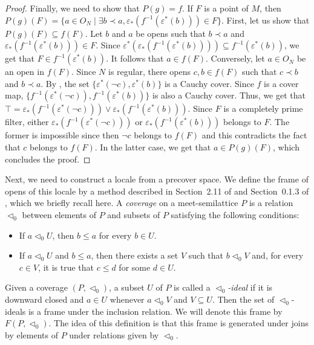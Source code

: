\documentclass[reqno]{amsart}
\theoremstyle{definition}
\theoremstyle{remark}
\numberwithin{figure}{section}
\newcommand{\rb}{\prec}
\begin{document}
\begin{proof}
Finally, we need to show that $P(g) = f$.
If $F$ is a point of $M$, then $P(g)(F) = \{ a \in O_N \mid \exists b \rb a, \varepsilon_*(f^{-1}(\varepsilon^*(b))) \in F \}$.
First, let us show that $P(g)(F) \subseteq f(F)$.
Let $b$ and $a$ be opens such that $b \rb a$ and $\varepsilon_*(f^{-1}(\varepsilon^*(b))) \in F$.
Since $\varepsilon^*(\varepsilon_*(f^{-1}(\varepsilon^*(b)))) \subseteq f^{-1}(\varepsilon^*(b))$, we get that $F \in f^{-1}(\varepsilon^*(b))$.
It follows that $a \in f(F)$.
Conversely, let $a \in O_N$ be an open in $f(F)$.
Since $N$ is regular, there opens $c,b \in f(F)$ such that $c \rb b$ and $b \rb a$.
By , the set $\{ \varepsilon^*(\neg c), \varepsilon^*(b) \}$ is a Cauchy cover.
Since $f$ is a cover map, $\{ f^{-1}(\varepsilon^*(\neg c)), f^{-1}(\varepsilon^*(b)) \}$ is also a Cauchy cover.
Thus, we get that $\top = \varepsilon_*(f^{-1}(\varepsilon^*(\neg c))) \vee \varepsilon_*(f^{-1}(\varepsilon^*(b)))$.
Since $F$ is a completely prime filter, either $\varepsilon_*(f^{-1}(\varepsilon^*(\neg c)))$ or $\varepsilon_*(f^{-1}(\varepsilon^*(b)))$ belongs to $F$.
The former is impossible since then $\neg c$ belongs to $f(F)$ and this contradicts the fact that $c$ belongs to $f(F)$.
In the latter case, we get that $a \in P(g)(F)$, which concludes the proof.
\end{proof}

Next, we need to construct a locale from a precover space.
We define the frame of opens of this locale by a method described in Section~2.11 of \cite{stone-spaces} and Section~0.1.3 of \cite{vickers-compact}, which we briefly recall here.
A \emph{coverage} on a meet-semilattice $P$ is a relation $\triangleleft_0$ between elements of $P$ and subsets of $P$ satisfying the following conditions:
\begin{itemize}
\item If $a \triangleleft_0 U$, then $b \leq a$ for every $b \in U$.
\item If $a \triangleleft_0 U$ and $b \leq a$, then there exists a set $V$ such that $b \triangleleft_0 V$ and, for every $c \in V$, it is true that $c \leq d$ for some $d \in U$.
\end{itemize}
Given a coverage $(P,\triangleleft_0)$, a subset $U$ of $P$ is called a \emph{$\triangleleft_0$-ideal} if it is downward closed and $a \in U$ whenever $a \triangleleft_0 V$ and $V \subseteq U$.
Then the set of $\triangleleft_0$-ideals is a frame under the inclusion relation.
We will denote this frame by $F(P,\triangleleft_0)$.
The idea of this definition is that this frame is generated under joins by elements of $P$ under relations given by $\triangleleft_0$.
\end{document}
